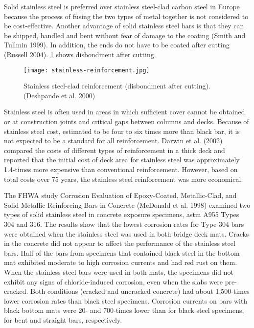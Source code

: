 Solid stainless steel is preferred over stainless steel-clad carbon steel in Europe because the process of fusing the two types of metal together is not considered to be cost-effective. Another advantage of solid stainless steel bars is that they can be shipped, handled and bent without fear of damage to the coating (Smith and Tullmin 1999). In addition, the ends do not have to be coated after cutting (Russell 2004). \cref{fig:stainless-reinforcement} shows disbondment after cutting.

\begin{figure}
  \texttt{[image: stainless-reinforcement.jpg]}
  \caption{Stainless steel-clad reinforcement (disbondment after cutting). (Deshpande et al. 2000)}
  \label{fig:stainless-reinforcement}
\end{figure}

Stainless steel is often used in areas in which sufficient cover cannot be obtained or at construction joints and critical gaps between columns and decks. Because of stainless steel cost, estimated to be four to six times more than black bar, it is not expected to be a standard for all reinforcement. Darwin et al. (2002) compared the costs of different types of reinforcement in a thick deck and reported that the initial cost of deck area for stainless steel was approximately 1.4-times more expensive than conventional reinforcement. However, based on total costs over 75 years, the stainless steel reinforcement was more economical.

The FHWA study Corrosion Evaluation of Epoxy-Coated, Metallic-Clad, and Solid Metallic Reinforcing Bars in Concrete (McDonald et al. 1998) examined two types of solid stainless steel in concrete exposure specimens, \acrshort*{astm} A955 Types 304 and 316. The results show that the lowest corrosion rates for Type 304 bars were obtained when the stainless steel was used in both bridge deck mats. Cracks in the concrete did not appear to affect the performance of the stainless steel bars. Half of the bars from specimens that contained black steel in the bottom mat exhibited moderate to high corrosion currents and had red rust on them. When the stainless steel bars were used in both mats, the specimens did not exhibit any signs of chloride-induced corrosion, even when the slabs were pre-cracked. Both conditions (cracked and uncracked concrete) had about 1,500-times lower corrosion rates than black steel specimens. Corrosion currents on bars with black bottom mats were 20- and 700-times lower than for black steel specimens, for bent and straight bars, respectively.

